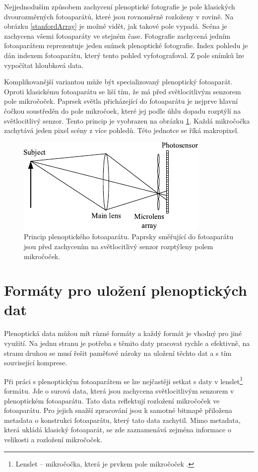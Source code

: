 Nejjednoduším způsobem zachycení plenoptické fotografie je pole klasických dvourozměrných fotoaparátů, které jsou rovnoměrně rozloženy v rovině.
Na obrázku \ref{stanfordArray} je možné vidět, jak takové pole vypadá.
Scéna je zachycena všemi fotoaparáty ve stejném čase.
Fotografie zachycená jedním fotoaparátem reprezentuje jeden snímek plenoptické fotografie.
Index pohledu je dán indexem fotoaparátu, který tento pohled vyfotografoval.
Z pole snímků lze vypočítat hloubková data.

Komplikovanější variantou může být specializovaný plenoptický fotoaparát.
Oproti klasickému fotoaparátu se liší tím, že má před světlocitlivým senzorem pole mikročoček.
Paprsek světla přicházející do fotoaparátu je nejprve hlavní čočkou soustředěn do pole mikročoek, které jej podle úhlu dopadu rozptýlí na světlocitlivý senzor.
Tento princip je vyobrazen na obrázku \ref{plenoPrincip}.
Každá mikročočka zachytává jeden pixel scény z více pohledů.
Této jednotce se říká makropixel.

\begin{figure}
	\centering
		\includegraphics[width=.4\textwidth]{obrazky-figures/pleno-cam.pdf}
		\caption{Princip plenoptického fotoaparátu. Paprsky směřující do fotoaparátu jsou před zachycením na světlocitlivý senzor rozptýleny polem mikročoček.}
		\label{plenoPrincip}
\end{figure}

\section{Formáty pro uložení plenoptických dat}
\label{light-field-formats}
Plenoptická data můžou mít různé formáty a každý formát je vhodný pro jiné využití.
Na jednu stranu je potřeba s těmito daty pracovat rychle a efektivně, na stranu druhou se musí řešit paměťové nároky na uložení těchto dat a s tím související komprese.

Při práci s plenoptickým fotoaparátem se lze nejčastěji setkat s daty v lenslet\footnote{Lenslet -- mikročočka, která je prvkem pole mikročoček \cite{lenslet}.} formátu. Jde o surová data, která jsou zachycena světlocitlivým senzorem v plenoptickém fotoaparátu.
Tato data reflektují rozložení mikročoček ve fotoaparátu.
Pro jejich snažší zpracování jsou k samotné bitmapě přiložena metadata o konstrukci fotoaparátu, který tato data zachytil.
Mimo metadata, která ukládá klasický fotoaparát, se zde zaznamenává zejména informace o velikosti a rozložení mikročoček.

